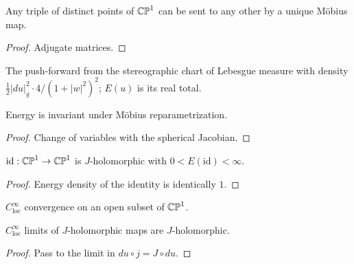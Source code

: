 \begin{theorem}
\label{thm_three_points}
\leanok
{}
Any triple of distinct points of $\mathbb{CP}^1$ can be sent to any other by a unique M\"obius map.
\end{theorem}
\begin{proof}\leanok Adjugate matrices.\end{proof}

\begin{definition}
\label{def_energy}
\leanok
{}
The push-forward from the stereographic chart of Lebesgue measure with density
$\tfrac12|du|_g^2\cdot 4/(1+|w|^2)^2$; $E(u)$ is its real total.
\end{definition}

\begin{theorem}
\label{thm_energy_conformal}
\leanok
{}
Energy is invariant under M\"obius reparametrization.
\end{theorem}
\begin{proof}\leanok Change of variables with the spherical Jacobian.\end{proof}

\begin{lemma}
\label{lem_id_energy}
\leanok
{}
$\mathrm{id}:\mathbb{CP}^1\to\mathbb{CP}^1$ is $J$-holomorphic with $0<E(\mathrm{id})<\infty$.
\end{lemma}
\begin{proof}\leanok Energy density of the identity is identically $1$.\end{proof}

\begin{definition}
\label{def_cinf_loc}
\leanok
{}
$C^\infty_{\mathrm{loc}}$ convergence on an open subset of $\mathbb{CP}^1$.
\end{definition}

\begin{lemma}
\label{lem_jhol_closure}
\leanok
{}
$C^\infty_{\mathrm{loc}}$ limits of $J$-holomorphic maps are $J$-holomorphic.
\end{lemma}
\begin{proof}\leanok Pass to the limit in $du\circ j=J\circ du$.\end{proof}

